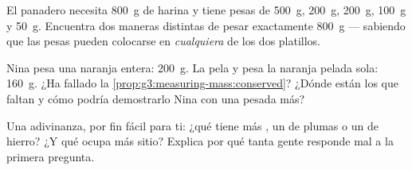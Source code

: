 \begin{exercise}[$\star$]\label{exo:g3:measuring-mass:9}
El panadero necesita \qty{800}{g} de harina y tiene pesas de
\qty{500}{g}, \qty{200}{g}, \qty{200}{g}, \qty{100}{g} y \qty{50}{g}.
Encuentra dos maneras distintas de pesar exactamente \qty{800}{g} ---
sabiendo que las pesas pueden colocarse en \emph{cualquiera} de los
dos platillos.
\end{exercise}

\begin{exercise}[$\star\star$]\label{exo:g3:measuring-mass:10}
Nina pesa una naranja entera: \qty{200}{g}. La pela y pesa la naranja
pelada sola: \qty{160}{g}. ¿Ha fallado la
\cref{prop:g3:measuring-mass:conserved}? ¿Dónde están los  que
faltan y cómo podría demostrarlo Nina con una pesada más?
\end{exercise}

\begin{exercise}[$\star\star$]\label{exo:g3:measuring-mass:11}
Una adivinanza, por fin fácil para ti: ¿qué tiene más , un
 de plumas o un  de hierro? ¿Y qué ocupa más
sitio? Explica por qué tanta gente responde mal a la primera
pregunta.
\end{exercise}
